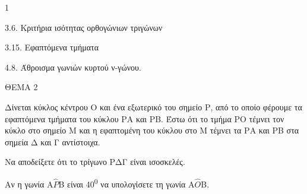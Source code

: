 \begin{ylh}{1}
    \item 3.6. Κριτήρια ισότητας ορθογώνιων τριγώνων
    \item 3.15. Εφαπτόμενα τμήματα
    \item 4.8. Άθροισμα γωνιών κυρτού ν-γώνου.
\end{ylh}

ΘΕΜΑ 2

Δίνεται κύκλος κέντρου Ο και ένα εξωτερικό του σημείο Ρ, από το οποίο φέρουμε τα εφαπτόμενα τμήματα του κύκλου ΡΑ και ΡΒ. Έστω ότι το τμήμα ΡΟ τέμνει τον κύκλο στο σημείο Μ και η εφαπτομένη του κύκλου στο Μ τέμνει τα ΡΑ και ΡΒ στα σημεία Δ και Γ αντίστοιχα.

\begin{alist}
\item Να αποδείξετε ότι το τρίγωνο ΡΔΓ είναι ισοσκελές. 

\item Αν η γωνία Α$\widehat{Ρ}$Β είναι 40\textsuperscript{0} να υπολογίσετε τη γωνία Α$\widehat{Ο}$Β. 


\begin{center}
\end{center}
\end{alist}
